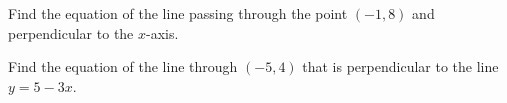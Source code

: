 \documentclass[11pt,letterpaper]{article}
\begin{document}

 Find the equation of the line passing through the point $(-1, 8)$ and perpendicular to the $x$-axis. 



\newpage



 Find the equation of the line through $(-5, 4)$ that is perpendicular to the line $y= 5 - 3x$. 
\end{document}
